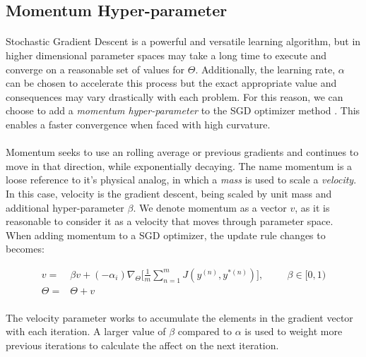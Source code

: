 \documentclass[12pt,letterpaper]{article}
\begin{document}

\subsection{Momentum Hyper-parameter}

\paragraph*{}Stochastic Gradient Descent is a powerful and versatile learning algorithm, but in higher dimensional parameter spaces may take a long time to execute and converge on a reasonable set of values for $\Theta$. Additionally, the learning rate, $\alpha$ can be chosen to accelerate this process but the exact appropriate value and consequences may vary drastically with each problem. For this reason, we can choose to add a \textit{momentum hyper-parameter} to the SGD optimizer method \cite{Geron}. This enables a faster convergence when faced with high curvature. 

\paragraph*{}Momentum seeks to use an rolling average or previous gradients and continues to move in that direction, while exponentially decaying.  The name momentum is a loose reference to it's physical analog, in which a \textit{mass} is used to scale a \textit{velocity}. In this case, velocity is the gradient descent, being scaled by unit mass and additional hyper-parameter $\beta$. We denote momentum as a vector $v$, as it is reasonable to consider it as a velocity that moves through parameter space. When adding momentum to a SGD optimizer, the update rule changes to becomes:

\begin{equation}
\label{momentum update}
\begin{split}
v =&  \beta v + (-\alpha_i)\nabla_{\Theta} \Big[ \frac{1}{m} \sum_{n=1}^{m} J(y^{(n)},y^{*(n)}) \Big] ,
\hspace{1cm} \beta \in [0,1) \\
\Theta =&  \Theta + v
\end{split} 
\end{equation}


\paragraph*{}The velocity parameter works to accumulate the elements in the gradient vector with each iteration. A larger value of $\beta$ compared to 
$\alpha$ is used to weight more previous iterations to calculate the affect on the next iteration.
\end{document}
